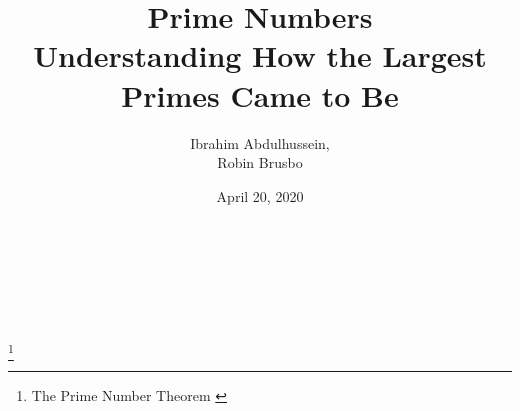 \documentclass[main.tex]{subfiles}
\begin{document}
\title{
    Prime Numbers \\[0.25em] \large Understanding How the Largest Primes Came to Be
}
\author{Ibrahim Abdulhussein, \\ Robin Brusbo}
\date{April 20, 2020}

\makeatletter

\begin{titlepage}
    \thispagestyle{fancy}
    \renewcommand{\headrulewidth}{0pt}
    \renewcommand{\footrulewidth}{0pt}
    \cfoot{}
    \hbox{}\vfill
    \begin{center}
        {\LARGE\@title}\\[2em]
        {\large\@author}\\[1em]
        {\large\@date}\\[6em]
        \\
        \footnote{The Prime Number Theorem \cite{theorem:prime_num}}
    \end{center}
    \vspace{3cm}\vfill
\end{titlepage}

\makeatother
\end{document}
